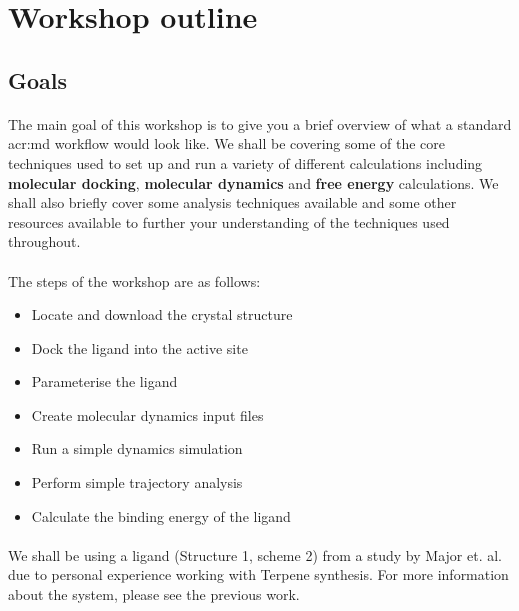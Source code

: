 \section{Workshop outline}
\label{sec:intro}

\subsection{Goals}
    \paragraph{}
    The main goal of this workshop is to give you a brief overview of what a standard \gls{acr:md} workflow would look like. We shall be covering some of the core techniques used to set up and run a variety of different calculations including \textbf{molecular docking}, \textbf{molecular dynamics} and \textbf{free energy} calculations. We shall also briefly cover some analysis techniques available and some other resources available to further your understanding of the techniques used throughout. 

    \paragraph{}
    The steps of the workshop are as follows:
    \begin{itemize}
        \item Locate and download the crystal structure
        \item Dock the ligand into the active site
        \item Parameterise the ligand
        \item Create molecular dynamics input files
        \item Run a simple dynamics simulation
        \item Perform simple trajectory analysis
        \item Calculate the binding energy of the ligand
    \end{itemize}

    \paragraph{}
    We shall be using a ligand (Structure 1, scheme 2) from a study by Major et. al.\cite{Weitman2010ChallengesMonoterpenes} due to personal experience working with Terpene synthesis. For more information about the system, please see the previous work. 

